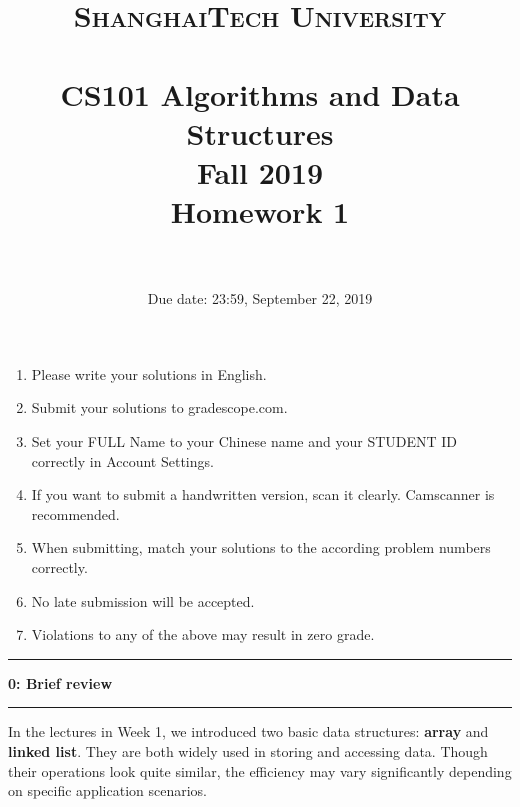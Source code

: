 \documentclass[10.5pt]{article}
\title{
    \normalfont \normalsize
    \textsc{ShanghaiTech University} \\ [25pt]
    \horrule{0.5pt} \\[0.4cm] %
    \huge CS101 Algorithms and Data Structures\\ %
    \LARGE Fall 2019\\
    \LARGE Homework 1\\
    \horrule{2pt} \\[0.5cm] %
}
\author{}
\date{Due date: 23:59, September 22, 2019}
\newcommand\question[2]{\vspace{.25in}\hrule\textbf{#1: #2}\vspace{.5em}\hrule\vspace{.10in}}
\begin{document}
\maketitle
\thispagestyle{firstpage}
\vspace{3ex}

\begin{enumerate}
\item Please write your solutions in English. 

\item Submit your solutions to gradescope.com.  

\item Set your FULL Name to your Chinese name and your STUDENT ID correctly in Account Settings. 

\item If you want to submit a handwritten version, scan it clearly. Camscanner is recommended. 

\item When submitting, match your solutions to the according problem numbers correctly. 

\item No late submission will be accepted.

\item Violations to any of the above may result in zero grade. 
\end{enumerate}
\newpage

\question{0}{Brief review}
In the lectures in Week 1, we introduced two basic data structures: \textbf{array} and \textbf{linked list}. They are both widely used in storing and accessing data. Though their operations look quite similar, the efficiency may vary significantly depending on specific application scenarios.\\
\end{document}
